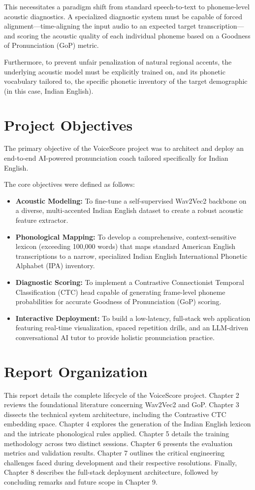 This necessitates a paradigm shift from standard speech-to-text to phoneme-level acoustic diagnostics. A specialized diagnostic system must be capable of forced alignment—time-aligning the input audio to an expected target transcription—and scoring the acoustic quality of each individual phoneme based on a Goodness of Pronunciation (GoP) metric. 

Furthermore, to prevent unfair penalization of natural regional accents, the underlying acoustic model must be explicitly trained on, and its phonetic vocabulary tailored to, the specific phonetic inventory of the target demographic (in this case, Indian English).

\section{Project Objectives}
The primary objective of the VoiceScore project was to architect and deploy an end-to-end AI-powered pronunciation coach tailored specifically for Indian English. 

The core objectives were defined as follows:
\begin{itemize}
    \item \textbf{Acoustic Modeling:} To fine-tune a self-supervised Wav2Vec2 backbone on a diverse, multi-accented Indian English dataset to create a robust acoustic feature extractor.
    \item \textbf{Phonological Mapping:} To develop a comprehensive, context-sensitive lexicon (exceeding 100,000 words) that maps standard American English transcriptions to a narrow, specialized Indian English International Phonetic Alphabet (IPA) inventory.
    \item \textbf{Diagnostic Scoring:} To implement a Contrastive Connectionist Temporal Classification (CTC) head capable of generating frame-level phoneme probabilities for accurate Goodness of Pronunciation (GoP) scoring.
    \item \textbf{Interactive Deployment:} To build a low-latency, full-stack web application featuring real-time visualization, spaced repetition drills, and an LLM-driven conversational AI tutor to provide holistic pronunciation practice.
\end{itemize}

\section{Report Organization}
This report details the complete lifecycle of the VoiceScore project. Chapter 2 reviews the foundational literature concerning Wav2Vec2 and GoP. Chapter 3 dissects the technical system architecture, including the Contrastive CTC embedding space. Chapter 4 explores the generation of the Indian English lexicon and the intricate phonological rules applied. Chapter 5 details the training methodology across two distinct sessions. Chapter 6 presents the evaluation metrics and validation results. Chapter 7 outlines the critical engineering challenges faced during development and their respective resolutions. Finally, Chapter 8 describes the full-stack deployment architecture, followed by concluding remarks and future scope in Chapter 9.
